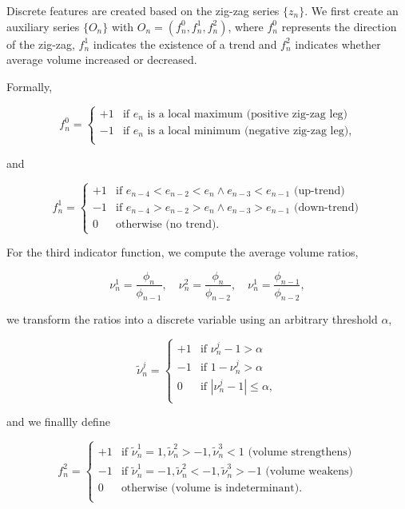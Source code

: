 \documentclass[]{article}
\begin{document}
Discrete features are created based on the zig-zag series \(\{z_n\}\).
We first create an auxiliary series \(\{O_n\}\) with
\(O_n = (f_n^0, f_n^1, f_n^2)\), where \(f_n^0\) represents the
direction of the zig-zag, \(f_n^1\) indicates the existence of a trend
and \(f_n^2\) indicates whether average volume increased or decreased.

Formally,

\[
f_n^0 =
\begin{cases}
+1 & \text{if $e_n$ is a local maximum (positive zig-zag leg)} \\
-1 & \text{if $e_n$ is a local minimum (negative zig-zag leg),} \\
\end{cases}
\]

and

\[
f_n^1 =
\begin{cases}
+1 & \text{if $e_{n-4} < e_{n-2} < e_{n} \wedge e_{n-3} < e_{n-1}$ (up-trend)} \\
-1 & \text{if $e_{n-4} > e_{n-2} > e_{n} \wedge e_{n-3} > e_{n-1}$ (down-trend)} \\
 0 & \text{otherwise (no trend).}
\end{cases}
\]

For the third indicator function, we compute the average volume ratios,

\[
\nu_n^1 = \frac{\phi_n}{\phi_{n-1}}, \quad \nu_n^2 = \frac{\phi_n}{\phi_{n-2}}, \quad \nu_n^1 = \frac{\phi_{n-1}}{\phi_{n-2}},
\]

we transform the ratios into a discrete variable using an arbitrary
threshold \(\alpha\),

\[
\tilde{\nu}_n^j =
\begin{cases}
+1 & \text{if $\nu_n^j - 1 > \alpha$} \\
-1 & \text{if $1 - \nu_n^j > \alpha$} \\
 0 & \text{if $|\nu_n^j - 1| \le \alpha$}, \\
\end{cases}
\]

and we finallly define

\[
f_n^2 =
\begin{cases}
+1 & \text{if $\tilde{\nu}_n^1 = 1, \tilde{\nu}_n^2 > -1, \tilde{\nu}_n^3 < 1$ (volume strengthens)} \\
-1 & \text{if $\tilde{\nu}_n^1 = -1, \tilde{\nu}_n^2 < -1, \tilde{\nu}_n^3 > -1$ (volume weakens)} \\
 0 & \text{otherwise (volume is indeterminant)}. \\
\end{cases}
\]
\end{document}
